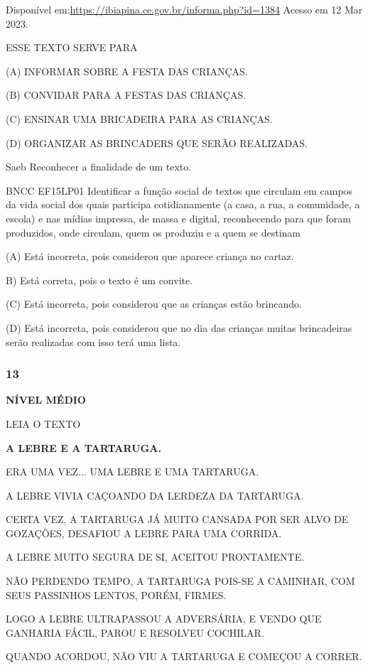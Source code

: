 Disponível em:\url{https://ibiapina.ce.gov.br/informa.php?id=1384}
Acesso em 12 Mar 2023.

ESSE TEXTO SERVE PARA

(A) INFORMAR SOBRE A FESTA DAS CRIANÇAS.

(B) CONVIDAR PARA A FESTAS DAS CRIANÇAS.

(C) ENSINAR UMA BRICADEIRA PARA AS CRIANÇAS.

(D) ORGANIZAR AS BRINCADERS QUE SERÃO REALIZADAS.

Saeb Reconhecer a finalidade de um texto.

BNCC EF15LP01 Identificar a função social de textos que circulam em
campos da vida social dos quais participa cotidianamente (a casa, a rua,
a comunidade, a escola) e nas mídias impressa, de massa e digital,
reconhecendo para que foram produzidos, onde circulam, quem os produziu
e a quem se destinam

(A) Está incorreta, pois considerou que aparece criança no cartaz.

B) Está correta, pois o texto é um convite.

(C) Está incorreta, pois considerou que as crianças estão brincando.

(D) Está incorreta, pois considerou que no dia das crianças muitas
brincadeiras serão realizadas com isso terá uma lista.

\subsubsection{13}\label{section-155}

\textbf{NÍVEL MÉDIO}

LEIA O TEXTO

\textbf{A LEBRE E A TARTARUGA.}

ERA UMA VEZ... UMA LEBRE E UMA TARTARUGA.

A LEBRE VIVIA CAÇOANDO DA LERDEZA DA TARTARUGA.

CERTA VEZ, A TARTARUGA JÁ MUITO CANSADA POR SER ALVO DE GOZAÇÕES,
DESAFIOU A LEBRE PARA UMA CORRIDA.

A LEBRE MUITO SEGURA DE SI, ACEITOU PRONTAMENTE.

NÃO PERDENDO TEMPO, A TARTARUGA POIS-SE A CAMINHAR, COM SEUS PASSINHOS
LENTOS, PORÉM, FIRMES.

LOGO A LEBRE ULTRAPASSOU A ADVERSÁRIA, E VENDO QUE GANHARIA FÁCIL, PAROU
E RESOLVEU COCHILAR.

QUANDO ACORDOU, NÃO VIU A TARTARUGA E COMEÇOU A CORRER.

